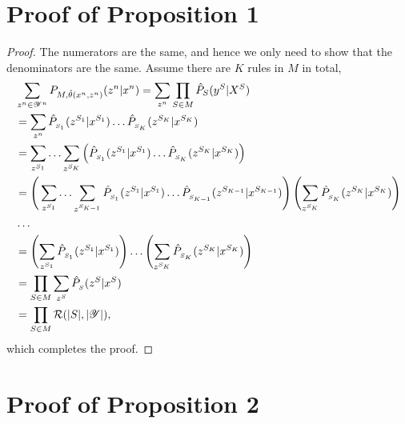 \section*{Proof of Proposition 1}
\primelemma*

\begin{proof}
The numerators are the same, and hence we only need to show that the denominators are the same. Assume there are $K$ rules in $M$ in total, 
\begin{equation} 
\begin{split}
		& \sum_{z^n \in \mathscr{Y}^n} P_{M, \hat{\theta}(x^n, z^n)}(z^n|x^n) = \sum_{z^n} \prod_{S\in M} \hat{P}_S(y^S|X^S) \\
		& = \sum_{z^n} \hat{P}_{_{S_1}}(z^{S_1}|x^{S_1}) \ldots \hat{P}_{_{S_K}}(z^{S_{K}}|x^{S_{K}}) \\
		& = \sum_{z^{S_1}} \ldots \sum_{z^{S_{K}}} \left(\hat{P}_{_{S_1}}(z^{S_1}|x^{S_1}) \ldots \hat{P}_{_{S_K}}(z^{S_{K}}|x^{S_{K}}) \right)\\
		& = \Bigg(\sum_{z^{S_1}} \ldots \sum_{z^{S_{K-1}}} \hat{P}_{_{S_1}}(z^{S_1}|x^{S_1}) \ldots \hat{P}_{_{S_{K-1}}} (z^{S_{K-1}}|x^{S_{K-1}}) \Bigg) \left(\sum_{z^{S_{K}}}  \hat{P}_{_{S_K}}(z^{S_{K}}|x^{S_{K}})\right) \\
				& \ldots \\
		& = \left(\sum_{z^{S_{1}}}  \hat{P}_{_{S_{1}}}(z^{S_{1}}|x^{S_{1}})\right) \ldots \left(\sum_{z^{S_{K}}}  \hat{P}_{_{S_K}}(z^{S_{K}}|x^{S_{K}})\right)\\
		& = \prod_{S \in M} \sum_{z^{S}}  \hat{P}_{_{S}}(z^{S}|x^{S}) \\
		& = \prod_{S \in M} \mathcal{R}(|S|, |\mathscr{Y}|),
\end{split}
\end{equation}
which completes the proof.
\end{proof}

\section*{Proof of Proposition 2}
\secondlemma*

